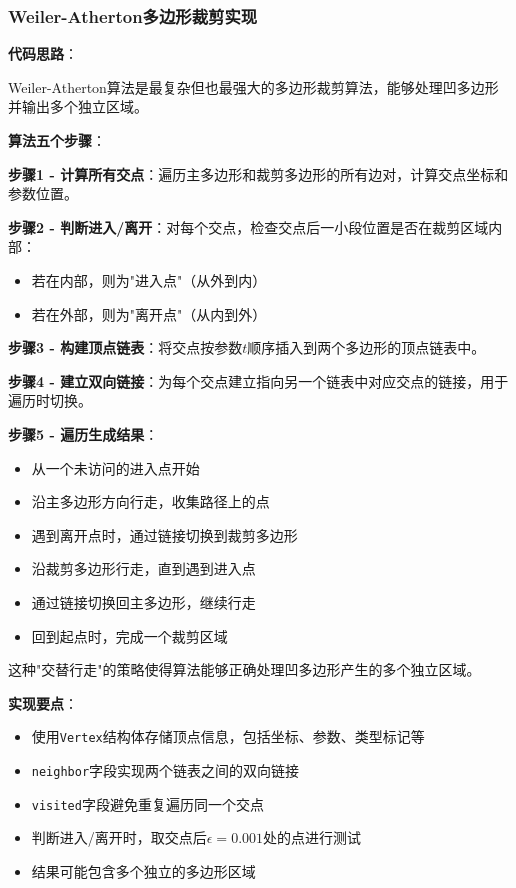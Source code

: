 \documentclass[12pt,a4paper]{article}
\begin{document}
\begin{tcolorbox}
\subsubsection{Weiler-Atherton多边形裁剪实现}

\textbf{代码思路}：

Weiler-Atherton算法是最复杂但也最强大的多边形裁剪算法，能够处理凹多边形并输出多个独立区域。

\textbf{算法五个步骤}：

\textbf{步骤1 - 计算所有交点}：遍历主多边形和裁剪多边形的所有边对，计算交点坐标和参数位置。

\textbf{步骤2 - 判断进入/离开}：对每个交点，检查交点后一小段位置是否在裁剪区域内部：
\begin{itemize}
    \item 若在内部，则为"进入点"（从外到内）
    \item 若在外部，则为"离开点"（从内到外）
\end{itemize}

\textbf{步骤3 - 构建顶点链表}：将交点按参数$t$顺序插入到两个多边形的顶点链表中。

\textbf{步骤4 - 建立双向链接}：为每个交点建立指向另一个链表中对应交点的链接，用于遍历时切换。

\textbf{步骤5 - 遍历生成结果}：
\begin{itemize}
    \item 从一个未访问的进入点开始
    \item 沿主多边形方向行走，收集路径上的点
    \item 遇到离开点时，通过链接切换到裁剪多边形
    \item 沿裁剪多边形行走，直到遇到进入点
    \item 通过链接切换回主多边形，继续行走
    \item 回到起点时，完成一个裁剪区域
\end{itemize}

这种"交替行走"的策略使得算法能够正确处理凹多边形产生的多个独立区域。

\textbf{实现要点}：
\begin{itemize}
    \item 使用\texttt{Vertex}结构体存储顶点信息，包括坐标、参数、类型标记等
    \item \texttt{neighbor}字段实现两个链表之间的双向链接
    \item \texttt{visited}字段避免重复遍历同一个交点
    \item 判断进入/离开时，取交点后$\epsilon=0.001$处的点进行测试
    \item 结果可能包含多个独立的多边形区域
\end{itemize}


\end{tcolorbox}
\end{document}
